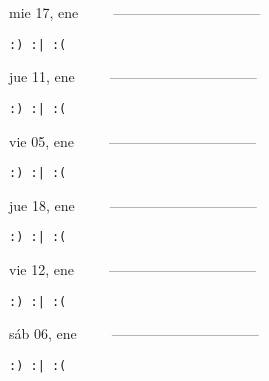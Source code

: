 \documentclass[letterpaper,10pt]{article}
\begin{document}
\begin{multicols}{3}
{mie 17, ene\ \ \ \ \ --------------------------------}
\begin{flushright}\begin{small}\texttt{:) :| :(}\end{small}\end{flushright}
\vfill
{jue 11, ene\ \ \ \ \ --------------------------------}
\begin{flushright}\begin{small}\texttt{:) :| :(}\end{small}\end{flushright}\par
\vfill
{vie 05, ene\ \ \ \ \ --------------------------------}
\begin{flushright}\begin{small}\texttt{:) :| :(}\end{small}\end{flushright}\par
\vfill
\end{multicols}
\vspace{1.05cm}

\begin{multicols}{3}
{jue 18, ene\ \ \ \ \ --------------------------------}
\begin{flushright}\begin{small}\texttt{:) :| :(}\end{small}\end{flushright}
\vfill
{vie 12, ene\ \ \ \ \ --------------------------------}
\begin{flushright}\begin{small}\texttt{:) :| :(}\end{small}\end{flushright}\par
\vfill
{sáb 06, ene\ \ \ \ \ --------------------------------}
\begin{flushright}\begin{small}\texttt{:) :| :(}\end{small}\end{flushright}\par
\vfill
\end{multicols}
\vspace{1.05cm}
\end{document}

